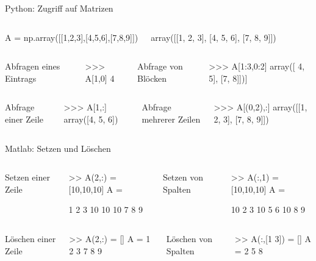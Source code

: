 \documentclass[hyperref={xetex}]{beamer}
\begin{document}
\begin{frame}[fragile]{Python: Zugriff auf Matrizen}
\begin{columns}[c]%
%
\begin{pyin}[basicstyle=\tiny]
A = np.array([[1,2,3],[4,5,6],[7,8,9]])
\end{pyin}%
\begin{pyout}
array([[1, 2, 3],
       [4, 5, 6],
       [7, 8, 9]])
\end{pyout}%
\end{columns}%
\begin{columns}[t,onlytextwidth]
Abfragen eines Eintrags
\begin{pyin}
>>> A[1,0]
4
\end{pyin}
Abfrage von Blöcken
\begin{pyin}
>>> A[1:3,0:2]
array([ 4, 5],
       [7, 8]])]
\end{pyin}
\end{columns}
\begin{columns}[t,onlytextwidth]
Abfrage einer Zeile
\begin{pyin}
>>> A[1,:]
array([4, 5, 6])
\end{pyin}
Abfrage mehrerer Zeilen
\begin{pyin}
>>> A[(0,2),:]
array([[1, 2, 3],
       [7, 8, 9]])
\end{pyin}
\end{columns}
\end{frame}

%
%
\begin{frame}[fragile]{Matlab: Setzen und Löschen}
\begin{columns}[c]%
%
\end{columns}%
\begin{columns}[t]
%
Setzen einer Zeile
\begin{matlabin}
>> A(2,:) = [10,10,10]
A =

     1     2     3
    10    10    10
     7     8     9
\end{matlabin}
%
Setzen von Spalten
\begin{matlabin}
>> A(:,1) = [10,10,10]
A =

    10     2     3
    10     5     6
    10     8     9
\end{matlabin}
\end{columns}
\begin{columns}[c]%
%
\end{columns}%
\begin{columns}[t]
%
Löschen einer Zeile
\begin{matlabin}
>> A(2,:) = []
A =
     1     2     3
     7     8     9
\end{matlabin}
%
Löschen von Spalten
\begin{matlabin}
>> A(:,[1 3]) = []
A =
     2
     5
     8
\end{matlabin}
\end{columns}
\end{frame}
\end{document}
